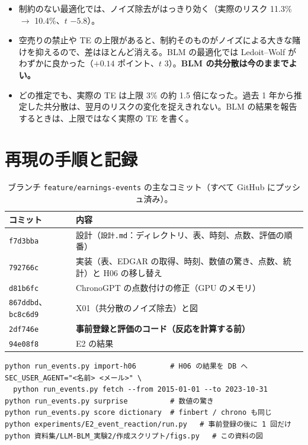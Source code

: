 \documentclass[xelatex,ja=standard,jafont=haranoaji,a4paper,10pt,openany]{bxjsreport}
\newcommand{\code}[1]{\texttt{#1}}
\begin{document}
\begin{itemize}
\item 制約のない最適化では、ノイズ除去がはっきり効く（実際のリスク 11.3\% $\to$ 10.4\%、$t$ $-5.8$）。
\item 空売りの禁止や TE の上限があると、制約そのものがノイズによる大きな賭けを抑えるので、差はほとんど消える。BLM の最適化では Ledoit--Wolf がわずかに良かった（$+0.14$ ポイント、$t$ 3）。\textbf{BLM の共分散は今のままでよい。}
\item どの推定でも、実際の TE は上限 3\% の約 1.5 倍になった。過去 1 年から推定した共分散は、翌月のリスクの変化を捉えきれない。BLM の結果を報告するときは、上限ではなく実際の TE を書く。
\end{itemize}

\chapter{再現の手順と記録}\label{app:repro}

\begin{table}[H]
\centering
\caption{ブランチ \code{feature/earnings-events} の主なコミット（すべて GitHub にプッシュ済み）。}
\small
\begin{tabular}{ll}
\toprule
コミット & 内容 \\
\midrule
\code{f7d3bba} & 設計（\code{設計.md}：ディレクトリ、表、時刻、点数、評価の順番） \\
\code{792766c} & 実装（表、EDGAR の取得、時刻、数値の驚き、点数、統計）と H06 の移し替え \\
\code{d81b6fc} & ChronoGPT の点数付けの修正（GPU のメモリ） \\
\code{867ddbd}、\code{bc8c6d9} & X01（共分散のノイズ除去）と図 \\
\code{2df746e} & \textbf{事前登録と評価のコード（反応を計算する前）} \\
\code{94e08f8} & E2 の結果 \\
\bottomrule
\end{tabular}
\end{table}

\begin{verbatim}
python run_events.py import-h06        # H06 の結果を DB へ
SEC_USER_AGENT="<名前> <メール>" \
  python run_events.py fetch --from 2015-01-01 --to 2023-10-31
python run_events.py surprise          # 数値の驚き
python run_events.py score dictionary  # finbert / chrono も同じ
python experiments/E2_event_reaction/run.py   # 事前登録の後に 1 回だけ
python 資料集/LLM-BLM_実験2/作成スクリプト/figs.py   # この資料の図
\end{verbatim}
\end{document}

